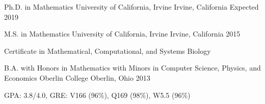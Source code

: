 

\begin{cventries}
\cventry
{Ph.D. in Mathematics} %
{University of California, Irvine} %
{Irvine, California} %
{Expected 2019} %
{
}

\cventry
{M.S. in Mathematics } %
{University of California, Irvine} %
{Irvine, California} %
{2015} %
{
	\begin{cvitems} %
		\item {Certificate in Mathematical, Computational, and Systems Biology}
	\end{cvitems}
}


  \cventry
    {B.A. with Honors in Mathematics with Minors in Computer Science, Physics, and Economics} %
    {Oberlin College} %
    {Oberlin, Ohio} %
    {2013} %
    {
      \begin{cvitems} %
        \item {GPA: 3.8/4.0, GRE: V166 (96\%), Q169 (98\%), W5.5 (96\%)}
      \end{cvitems}
    }

\end{cventries}

